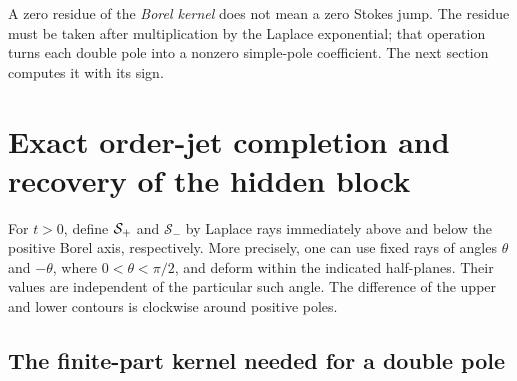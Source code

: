 \documentclass[11pt,a4paper]{article}
\numberwithin{equation}{section}
\theoremstyle{definition}\newtheorem{definition}[theorem]{Definition}
\theoremstyle{remark}\newtheorem{remark}[theorem]{Remark}
\newcommand{\Sm}{\mathcal S_-}\newcommand{\Med}{\mathcal M}
\begin{document}
A zero residue of the \emph{Borel kernel} does not mean a zero Stokes
jump. The residue must be taken after multiplication by the Laplace
exponential; that operation turns each double pole into a nonzero
simple-pole coefficient. The next section computes it with its sign.

\section{Exact order-jet completion and recovery of the hidden block}
\label{sec:completion}

For $t>0$, define $\mathcal S_+$ and $\Sm$ by Laplace rays immediately above
and below the positive Borel axis, respectively. More precisely, one
can use fixed rays of angles $\theta$ and $-\theta$, where
$0<\theta<\pi/2$, and deform within the indicated half-planes. Their
values are independent of the particular such angle. The difference
of the upper and lower contours is clockwise around positive poles.

\subsection{The finite-part kernel needed for a double pole}
\end{document}
